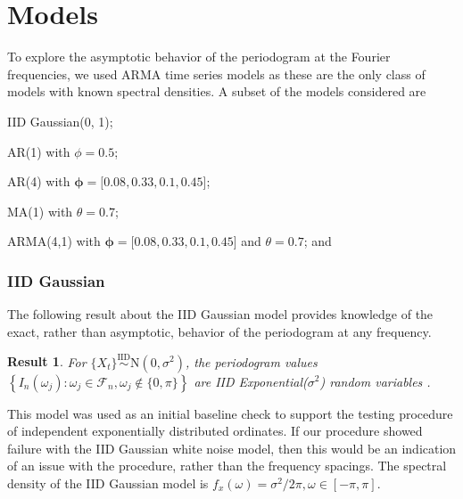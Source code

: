 \documentclass{article}\usepackage{graphicx, color}
\theoremstyle{plain}
\newtheorem{res}{Result}
\begin{document}



\section{Models}\label{sec:models}

To explore the asymptotic behavior of the periodogram at the Fourier frequencies, we used ARMA time series models as these are the only class of models with known spectral densities. A subset of the models considered are \begin{inparaenum}
\item IID Gaussian(0, 1);
\item AR(1) with $\phi = 0.5$; 
\item AR(4) with $\boldsymbol{\phi} = [0.08, 0.33, 0.1, 0.45$];
\item MA(1) with $\theta = 0.7$;
\item ARMA(4,1) with $\boldsymbol{\phi} = [0.08, 0.33, 0.1, 0.45$] and $\theta = 0.7$; and
\end{inparaenum}

\subsubsection*{IID Gaussian}
The following result about the IID Gaussian model provides knowledge of the exact, rather than asymptotic, behavior of the periodogram at any frequency.

\begin{res}
For $\{X_t\} \stackrel{\text{IID}}{\sim} \text{N}(0,\sigma^2)$, the periodogram values $\left\{ I_n(\omega_j): \omega_j \in \mathcal{F}_n, \omega_j \not\in \{0,\pi\} \right\}$ are IID Exponential($\sigma^2$) random variables \cite{brockwell2002introduction}.
\end{res}

This model was used as an initial baseline check to support the testing procedure of independent exponentially distributed ordinates. If our procedure showed failure with the IID Gaussian white noise model, then this would be an indication of an issue with the procedure, rather than the frequency spacings. The spectral density of the IID Gaussian model is $f_x(\omega) = \sigma^2/2\pi, \omega \in [-\pi, \pi]$.
\end{document}
